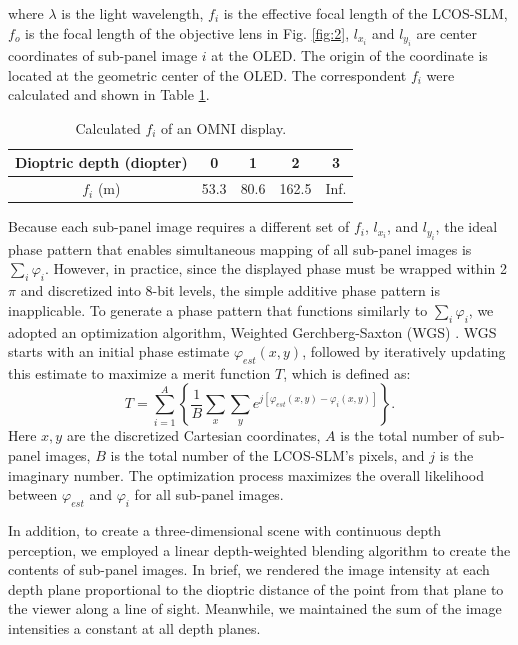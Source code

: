 \documentclass[9pt,twocolumn,twoside]{osajnl}
\begin{document}
where $\lambda$ is the light wavelength, $f_i$ is the effective focal length of the LCOS-SLM, $f_o$ is the focal length of the objective lens in Fig. \ref{fig:2}, $l_{x_i}$ and $l_{y_i}$ are center coordinates of sub-panel image $i$ at the OLED. The origin of the coordinate is located at the geometric center of the OLED. The correspondent $f_i$ were calculated and shown in Table \ref{table:1}.\par
\begin{table}[htbp]
	\centering
	\caption{Calculated $f_i$ of an OMNI display.}
	\label{table:1}
	\begin{tabular}{ccccc}
		\hline
		Dioptric depth (diopter)&0&1&2&3\\
		\hline
		$f_i$ (m)&53.3&80.6&162.5&Inf.\\
		\hline
	\end{tabular}
\end{table}
Because each sub-panel image requires a different set of $f_i$, $l_{x_i}$, and $l_{y_i}$, the ideal phase pattern that enables simultaneous mapping of all sub-panel images is $\sum_{i}\varphi_{i}$. However, in practice, since the displayed phase must be wrapped within 2$\pi$ and discretized into 8-bit levels, the simple additive phase pattern is inapplicable. To generate a phase pattern that functions similarly to $\sum_{i}\varphi_{i}$, we adopted an optimization algorithm, Weighted Gerchberg-Saxton (WGS) \cite{di2007computer,bianchi2010real}. WGS starts with an initial phase estimate $\varphi_{est}(x,y)$, followed by iteratively updating this estimate to maximize a merit function $T$, which is defined as:
\begin{equation}
T=\sum_{i=1}^{A}\left\{\frac{1}{B}\sum_{x}\sum_{y}e^{j\left[\varphi _{est}(x,y)-\varphi _{i}(x,y)\right]}\right\}.
\label{eq:2}
\end{equation}
Here $x, y$ are the discretized Cartesian coordinates, $A$ is the total number of sub-panel images, $B$ is the total number of the LCOS-SLM’s pixels, and $j$ is the imaginary number. The optimization process maximizes the overall likelihood between $\varphi _{est}$ and $\varphi _{i}$ for all sub-panel images.\par
In addition, to create a three-dimensional scene with continuous depth perception, we employed a linear depth-weighted blending algorithm \cite{ravikumar2011creating} to create the contents of sub-panel images. In brief, we rendered the image intensity at each depth plane proportional to the dioptric distance of the point from that plane to the viewer along a line of sight. Meanwhile, we maintained the sum of the image intensities a constant at all depth planes.\par
\end{document}
